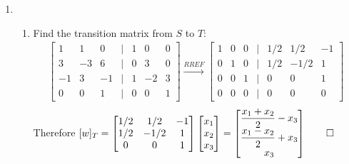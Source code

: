 \documentclass[12pt, a4paper]{article}
\begin{document}
\begin{enumerate}[Q\arabic*.]
\item 
  \begin{enumerate}[(\alph*)]
    \item Find the transition matrix from $S$ to $T$: 
      \begin{align*}
        \begin{bmatrix}
          1 & 1 & 0 & | & 1 & 0 & 0\\
          3 & -3 & 6 & | & 0 & 3 & 0\\
          -1 & 3 & -1 & | & 1 & -2 & 3\\
          0 & 0 & 1 & | & 0 & 0 & 1
        \end{bmatrix}\xrightarrow{RREF}
        \begin{bmatrix}
          1 & 0 & 0 & | & 1 /2 & 1 /2 & -1\\
          0 & 1 & 0 & | & 1 /2 & -1 /2 & 1\\
          0 & 0 & 1 & | & 0 & 0 & 1\\
          0 & 0 & 0 & | & 0 & 0 & 0
        \end{bmatrix}\\
      \end{align*}
      Therefore $[w]_T = \begin{bmatrix}1 /2 & 1 /2 & -1\\ 1 /2 & -1 /2 & 1\\ 0 & 0 & 1\end{bmatrix}\begin{bmatrix}x_1\\x_2\\x_3\end{bmatrix} = \begin{bmatrix}\displaystyle \frac{x_1+x_2}{2}-x_3\\\displaystyle \frac{x_1-x_2}{2}+x_3\\x_3\end{bmatrix} \qed$


\end{enumerate}
\end{enumerate}
\end{document}
